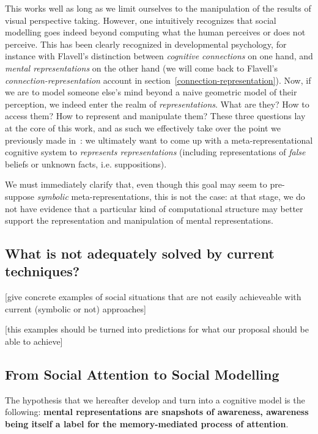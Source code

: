 \documentclass[a4paper]{article}
\newcommand{\ie}{i.e.\xspace}
\begin{document}
This works well as long as we limit ourselves to the manipulation of the results
of visual perspective taking. However, one intuitively recognizes that social
modelling goes indeed beyond computing what the human perceives or does not
perceive. This has been clearly recognized in developmental psychology, for
instance with Flavell's distinction between \emph{cognitive connections} on one
hand, and \emph{mental representations} on the other hand (we will come back to
Flavell's \emph{connection-representation} account in
section~\ref{connection-representation}). Now, if we are to model someone else's
mind beyond a naive geometric model of their perception, we indeed enter the
realm of \emph{representations}. What are they? How to access them? How to
represent and manipulate them? These three questions lay at the core of this
work, and as such we effectively take over the point we previously made
in~\cite{lemaignan2015mutual}:  we ultimately want to come up with a
meta-representational cognitive system to \emph{represents
representations} (including representations of \emph{false} beliefs or unknown
facts, \ie suppositions).

We must immediately clarify that, even though this goal may seem to pre-suppose
\emph{symbolic} meta-representations, this is not the case: at that stage, we do
not have evidence that a particular kind of computational structure may better
support the representation and manipulation of mental representations.

\subsection{What is not adequately solved by current techniques?}

[give concrete examples of social situations that are not easily achieveable
with current (symbolic or not) approaches]

[this examples should be turned into predictions for what our proposal should be
able to achieve]

\subsection{From Social Attention to Social Modelling}

The hypothesis that we hereafter develop and turn into a cognitive model is the
following: \textbf{mental representations are snapshots of awareness, awareness being
itself a label for the memory-mediated process of attention}.
\end{document}
